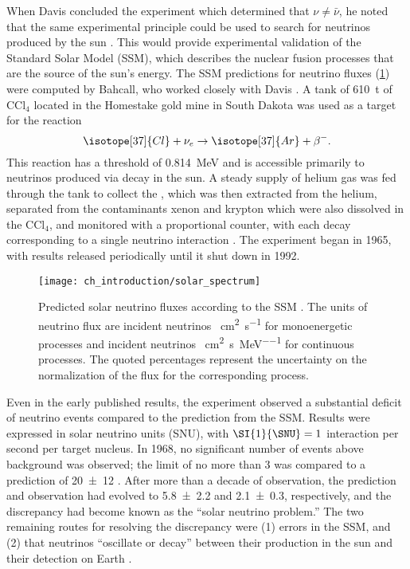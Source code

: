 When Davis concluded the experiment which determined that $\nu\neq\bar{\nu}$,
he noted that the same experimental principle could be used
to search for neutrinos produced by the sun \cite{davis_diff_nuebar}.
This would provide experimental validation of the Standard Solar Model (SSM),
which describes the nuclear fusion processes
that are the source of the sun's energy.
The SSM predictions for neutrino fluxes (\cref{fig:solarflux})
were computed by Bahcall,
who worked closely with Davis \cite{bahcall2004}.
A tank of \SI{610}{\tonne} of $\text{CCl}_4$
located in the Homestake gold mine in South Dakota
was used as a target for the reaction
\begin{equation}\label{eq:davis_nu}
    \isotope[37]{Cl} + \nu_e \to \isotope[37]{Ar} + \beta^-.
\end{equation}
This reaction has a threshold of \SI{0.814}{\MeV} \cite{solar_review}
and is accessible primarily to neutrinos
produced via  decay in the sun.
A steady supply of helium gas was fed through the tank
to collect the ,
which was then extracted from the helium,
separated from the contaminants xenon and krypton which were
also dissolved in the $\text{CCl}_4$,
and monitored with a proportional counter,
with each decay corresponding to a single neutrino interaction \cite{homestake1968}.
The experiment began in 1965, with results released periodically
until it shut down in 1992.

\begin{figure}
    \centering
    \texttt{[image: ch\_introduction/solar\_spectrum]}
    \caption{
        Predicted solar neutrino fluxes according to the SSM \cite{bahcall2004}.
        The units of neutrino flux are incident neutrinos
        \si[per-mode=reciprocal]{\per\square\cm\per\second} for monoenergetic processes
        and incident neutrinos
        \si[per-mode=reciprocal]{\per\square\cm\per\second\per\MeV}
        for continuous processes.
        The quoted percentages represent the uncertainty
        on the normalization of the flux for the corresponding process.
    }
    \label{fig:solarflux}
\end{figure}

Even in the early published results,
the experiment observed a substantial deficit of neutrino events
compared to the prediction from the SSM.
Results were expressed in solar neutrino units (SNU),
with $\SI{1}{\SNU} = 1$ interaction per second per target nucleus.
In 1968, no significant number of events above background was observed;
the limit of no more than \SI{3}{\SNU} was compared to a prediction of
\SI{20\pm12}{\SNU} \cite{homestake1968}.
After more than a decade of observation,
the prediction and observation had evolved to \SI{5.8\pm2.2}{\SNU}
and \SI{2.1\pm0.3}{\SNU}, respectively,
and the discrepancy had become known as the ``solar neutrino problem.''
The two remaining routes for resolving the discrepancy were
(1) errors in the SSM, and (2) that neutrinos ``oscillate or decay''
between their production in the sun and their detection on Earth \cite{davis1985}.

